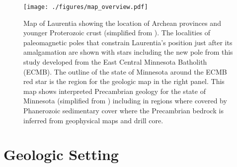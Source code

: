 \documentclass[draft]{agujournal2019}
\begin{document}
\begin{figure}[!ht]
\centering
\noindent\texttt{[image: ./figures/map\_overview.pdf]}
\caption{\small{Map of Laurentia showing the location of Archean provinces and younger Proterozoic crust (simplified from \cite{Whitmeyer2007a}). The localities of paleomagnetic poles that constrain Laurentia's position just after its amalgamation are shown with stars including the new pole from this study developed from the East Central Minnesota Batholith (ECMB). The outline of the state of Minnesota around the ECMB red star is the region for the geologic map in the right panel. This map shows interpreted Precambrian geology for the state of Minnesota (simplified from ) including in regions where covered by Phanerozoic sedimentary cover where the Precambrian bedrock is inferred from geophysical maps and drill core.}}
\label{fig:Laurentia_map}
\end{figure}

\section{Geologic Setting}
\end{document}
